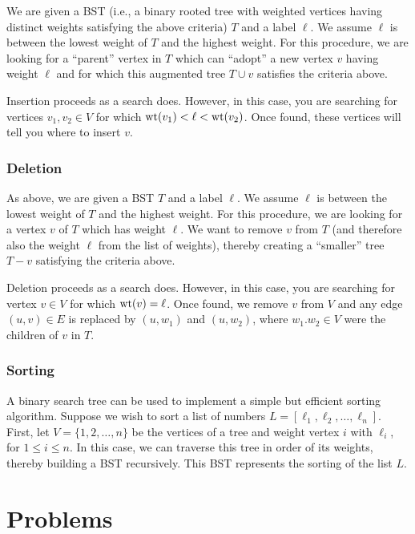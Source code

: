 We are given a BST (i.e., a binary rooted tree with weighted vertices
having distinct weights satisfying the above criteria) $T$ and a
label $\ell$. We assume $\ell$ is between the
lowest weight of $T$ and the highest weight.
For this procedure, we are looking for a ``parent''
vertex in $T$ which can ``adopt'' a new vertex $v$ having weight $\ell$
and for which this augmented tree $T\cup v$ satisfies
the criteria above.

Insertion proceeds as a search does. However, in this case, you are
searching for vertices $v_1,v_2\in V$ for which
${\rm wt}(v_1)<\ell < {\rm wt}(v_2)$. Once found, these
vertices will tell you where to insert $v$.

\subsubsection{Deletion}

As above, we are given a BST $T$ and a
label $\ell$. We assume $\ell$ is between the
lowest weight of $T$ and the highest weight.
For this procedure, we are looking for a vertex $v$ of
$T$ which has weight $\ell$. We want to remove $v$ from
$T$ (and therefore also the weight $\ell$ from the list of weights),
thereby creating a ``smaller'' tree $T- v$ satisfying
the criteria above.

Deletion proceeds as a search does. However, in this case, you are
searching for vertex $v\in V$ for which
${\rm wt}(v)=\ell$. Once found, we remove $v$ from $V$
and any edge $(u,v)\in E$ is replaced by $(u,w_1)$
and $(u,w_2)$, where $w_1.w_2\in V$ were the children of $v$
in $T$.

\subsubsection{Sorting}

A binary search tree can be used to implement a simple but efficient
sorting algorithm. Suppose we wish to sort a list of numbers
$L = [\ell_1, \ell_2,\dots, \ell_n]$. First, let $V=\{1,2,\dots,n\}$
be the vertices of a tree and weight vertex $i$ with $\ell_i$,
for $1\leq i\leq n$. In this case, we can traverse this tree
in order of its weights, thereby building a BST recursively.
This BST represents the sorting of the list $L$.



\section{Problems}

